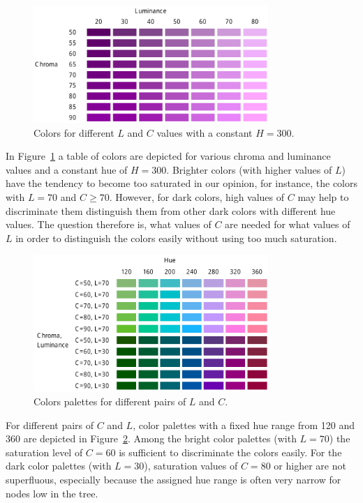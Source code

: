\documentclass[review,journal]{vgtc}         %
\begin{document}
\begin{figure}[tb]
  \centering
  \includegraphics[width=3.5in]{LC.pdf}
  \caption{Colors for different $L$ and $C$ values with a constant $H=300$.}\label{fig:lc}
\end{figure}

In Figure~\ref{fig:lc} a table of colors are depicted for various chroma and luminance values and a constant hue of $H=300$. Brighter colors (with higher values of $L$) have the tendency to become too saturated in our opinion, for instance, the colors with $L=70$ and $C\geq70$. However, for dark colors, high values of $C$ may help to discriminate them distinguish them from other dark colors with different hue values. The question therefore is, what values of $C$ are needed for what values of $L$ in order to distinguish the colors easily without using too much saturation.


\begin{figure}[!b]
  \centering
  \includegraphics[width=3.5in]{LC2.pdf}
  \caption{Colors palettes for different pairs of $L$ and $C$.}\label{fig:lc2}
\end{figure}

For different pairs of $C$ and $L$, color palettes with a fixed hue range from 120 and 360 are depicted in Figure~\ref{fig:lc2}. Among the bright color palettes (with $L=70$) the saturation level of $C=60$ is sufficient to discriminate the colors easily. For the dark color palettes (with $L=30$), saturation values of $C=80$ or higher are not superfluous, especially because the assigned hue range is often very narrow for nodes low in the tree.
\end{document}
